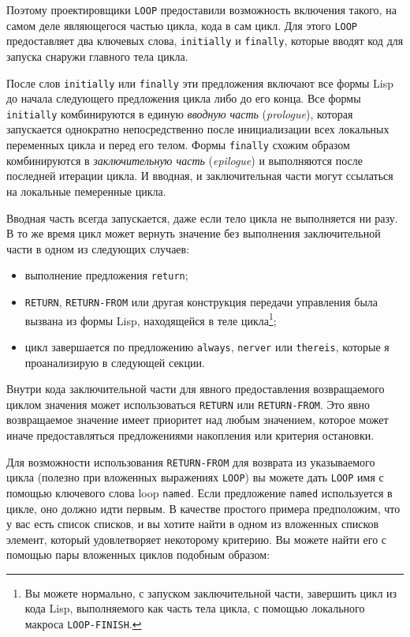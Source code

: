 Поэтому проектировщики \lstinline{LOOP} предоставили возможность включения такого, на самом
деле являющегося частью цикла, кода в сам цикл. Для этого \lstinline{LOOP} предоставляет два
ключевых слова, \lstinline{initially} и \lstinline{finally}, которые вводят код для запуска снаружи
главного тела цикла.

После слов \lstinline{initially} или \lstinline{finally} эти предложения включают все формы Lisp до
начала следующего предложения цикла либо до его конца. Все формы \lstinline{initially}
комбинируются в единую \textit{вводную часть} (\textit{prologue}), которая запускается
однократно непосредственно после инициализации всех локальных переменных цикла и перед его
телом. Формы \lstinline{finally} схожим образом комбинируются в \textit{заключительную часть}
(\textit{epilogue}) и выполняются после последней итерации цикла. И вводная, и
заключительная части могут ссылаться на локальные пемеренные цикла.

Вводная часть всегда запускается, даже если тело цикла не выполняется ни разу. В то же
время цикл может вернуть значение без выполнения заключительной части в одном из следующих
случаев:
\begin{itemize}
\item выполнение предложения \lstinline{return};
\item \lstinline{RETURN}, \lstinline{RETURN-FROM} или другая конструкция передачи управления
  была вызвана из формы Lisp, находящейся в теле цикла\footnote{Вы можете нормально, с
    запуском заключительной части, завершить цикл из кода Lisp, вы\-пол\-няе\-мо\-го как часть
    тела цикла, с помощью локального макроса \lstinline{LOOP-FINISH}.};
\item цикл завершается по предложению \lstinline{always}, \lstinline{nerver} или \lstinline{thereis},
  которые я проанализирую в следующей секции.
\end{itemize}

Внутри кода заключительной части для явного предоставления возвращаемого циклом значения
может использоваться \lstinline{RETURN} или \lstinline{RETURN-FROM}. Это явно возвращаемое
значение имеет приоритет над любым значением, которое может иначе предоставляться
предложениями накопления или критерия остановки.

Для возможности использования \lstinline{RETURN-FROM} для возврата из указываемого цикла
(полезно при вложенных выражениях \lstinline{LOOP}) вы можете дать \lstinline{LOOP} имя с
помощью ключевого слова loop \lstinline{named}. Если предложение \lstinline{named} используется в
цикле, оно должно идти первым. В качестве простого примера предположим, что у вас есть
список списков, и вы хотите найти в одном из вложенных списков элемент, который
удовлетворяет некоторому критерию. Вы можете найти его с помощью пары вложенных циклов
подобным образом:

